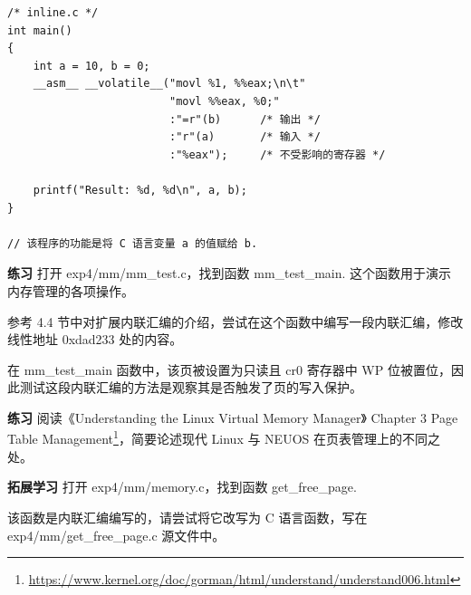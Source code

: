 \begin{lstlisting}
/* inline.c */
int main()
{
    int a = 10, b = 0;
    __asm__ __volatile__("movl %1, %%eax;\n\t"
                         "movl %%eax, %0;"
                         :"=r"(b)      /* 输出 */    
                         :"r"(a)       /* 输入 */
                         :"%eax");     /* 不受影响的寄存器 */
     
    printf("Result: %d, %d\n", a, b);
}

// 该程序的功能是将 C 语言变量 a 的值赋给 b.
\end{lstlisting}

\begin{mdframed}[hidealllines=true,backgroundcolor=gray!20]
\textbf{练习 }打开 exp4/mm/mm\_test.c，找到函数 mm\_test\_main. 这个函数用于演示内存管理的各项操作。

参考 4.4 节中对扩展内联汇编的介绍，尝试在这个函数中编写一段内联汇编，修改线性地址 0xdad233 处的内容。

在 mm\_test\_main 函数中，该页被设置为只读且 cr0 寄存器中 WP 位被置位，因此测试这段内联汇编的方法是观察其是否触发了页的写入保护。
\end{mdframed}

\begin{mdframed}[hidealllines=true,backgroundcolor=gray!20]
\textbf{练习 }阅读《Understanding the Linux Virtual Memory Manager》 Chapter 3  Page Table Management\footnote{\url{https://www.kernel.org/doc/gorman/html/understand/understand006.html}}，简要论述现代 Linux 与 NEUOS 在页表管理上的不同之处。
\end{mdframed}

\begin{mdframed}[hidealllines=true,backgroundcolor=gray!20]
\textbf{拓展学习 }打开 exp4/mm/memory.c，找到函数 get\_free\_page.

该函数是内联汇编编写的，请尝试将它改写为 C 语言函数，写在 exp4/mm/get\_free\_page.c 源文件中。
\end{mdframed}
